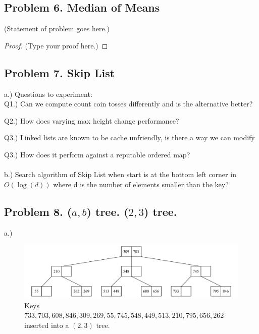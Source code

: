 \documentclass[12pt]{article}
\begin{document}
	
	\subsection*{Problem 6. Median of Means}
	(Statement of problem goes here.)\\
	
	\begin{proof}
		(Type your proof here.)
	\end{proof}
	
	\vspace{2in} %
	
	
	\subsection*{Problem 7. Skip List}
	
	a.) Questions to experiment:\\
	
	Q1.) Can we compute count coin tosses differently and is the alternative better?
	
	Q2.) How does varying max height change performance?
	
	Q3.) Linked lists are known to be cache unfriendly, is there a way we can modify 
	
	Q3.) How does it perform against a reputable ordered map?
	\\\\
	
	b.) Search algorithm of Skip List when start is at the bottom left corner in $O(\log(d))$ where d is the number of elements smaller than the key?
	

	
	\vspace{2in} %
	
	
	
	\subsection*{Problem 8. ($a,b$) tree. ($2, 3$) tree.}

	a.)	
	\begin{figure}[H] 
		\centering
		\includegraphics[width=0.9\linewidth]{Q8_a.drawio}
		\caption{Keys $733, 703, 608, 846, 309, 269, 55, 745, 548, 449, 513, 210, 795, 656, 262$ inserted into a $(2, 3)$ tree.}
		\label{fig:q8a}
	\end{figure}
	
\end{document}
